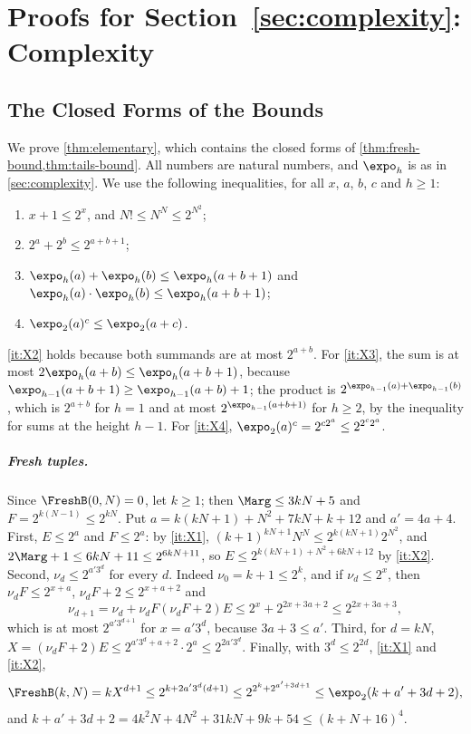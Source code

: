 \section{Proofs for Section~\ref{sec:complexity}: Complexity}
\label{app:complexity}

\subsection{The Closed Forms of the Bounds}\label{app:complexity-closed}

We prove \cref{thm:elementary}, which contains the closed forms of
\cref{thm:fresh-bound,thm:tails-bound}. All numbers are natural numbers,
and $\expo_h$ is as in \cref{sec:complexity}. We use the following
inequalities, for all $x$, $a$, $b$, $c$ and $h\ge1$:
\begin{enumerate}[label=\textup{(X\arabic*)}]
\item\label{it:X1} $x+1\le2^x$, and $N!\le N^N\le2^{N^2}$;
\item\label{it:X2} $2^a+2^b\le2^{a+b+1}$;
\item\label{it:X3} $\expo_h(a)+\expo_h(b)\le\expo_h(a+b+1)$ and
  $\expo_h(a)\cdot\expo_h(b)\le\expo_h(a+b+1)$;
\item\label{it:X4} $\expo_2(a)^c\le\expo_2(a+c)$.
\end{enumerate}
\ref{it:X2} holds because both summands are at most $2^{a+b}$. For
\ref{it:X3}, the sum is at most $2\expo_h(a+b)\le\expo_h(a+b+1)$, because
$\expo_{h-1}(a+b+1)\ge\expo_{h-1}(a+b)+1$; the product is
$2^{\expo_{h-1}(a)+\expo_{h-1}(b)}$, which is $2^{a+b}$ for $h=1$ and at
most $2^{\expo_{h-1}(a+b+1)}$ for $h\ge2$, by the inequality for sums at the
height $h-1$. For \ref{it:X4}, $\expo_2(a)^c=2^{c2^a}\le2^{2^c2^a}$.

\subparagraph*{Fresh tuples.}
Since $\FreshB(0,N)=0$, let $k\ge1$; then $\Marg\le3kN+5$ and
$F=2^{k(N-1)}\le2^{kN}$. Put $a=k(kN+1)+N^2+7kN+k+12$ and $a'=4a+4$. First,
$E\le2^a$ and $F\le2^a$: by \ref{it:X1}, $(k+1)^{kN+1}N^N\le
2^{k(kN+1)}2^{N^2}$, and $2\Marg+1\le6kN+11\le2^{6kN+11}$, so $E\le
2^{k(kN+1)+N^2+6kN+12}$ by \ref{it:X2}. Second, $\nu_d\le2^{a'3^d}$ for
every $d$. Indeed $\nu_0=k+1\le2^k$, and if $\nu_d\le2^x$, then
$\nu_dF\le2^{x+a}$, $\nu_dF+2\le2^{x+a+2}$ and
\[
  \nu_{d+1}=\nu_d+\nu_dF(\nu_dF+2)E\le2^x+2^{2x+3a+2}\le2^{2x+3a+3},
\]
which is at most $2^{a'3^{d+1}}$ for $x=a'3^d$, because $3a+3\le a'$. Third,
for $d=kN$, $X=(\nu_dF+2)E\le2^{a'3^d+a+2}\cdot2^a\le2^{2a'3^d}$. Finally,
with $3^d\le2^{2d}$, \ref{it:X1} and \ref{it:X2},
\[
  \FreshB(k,N)=kX^{d+1}\le2^{k+2a'3^d(d+1)}\le2^{2^k+2^{a'+3d+1}}
  \le\expo_2(k+a'+3d+2),
\]
and $k+a'+3d+2=4k^2N+4N^2+31kN+9k+54\le(k+N+16)^4$.

